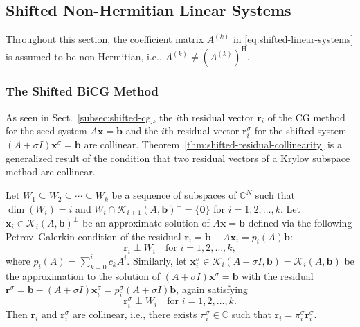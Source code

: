 \subsection{{Shifted Non-Hermitian Linear Systems}}\label{sec:shifted-nonhermitian-systems}
{Throughout this section, the coefficient matrix $A^{(k)}$ in \eqref{eq:shifted-linear-systems} is assumed to be non-Hermitian, i.e., $A^{(k)}\ne(A^{(k)})^{\mathrm H}$.}
\subsubsection{{The Shifted BiCG Method}}\label{subsec:shifted-bicg}
{As seen in Sect.\ \ref{subsec:shifted-cg}, the $i$th residual vector $\bm r_i$ of the CG method for the seed system $A\bm x=\bm b$ and the $i$th residual vector $\bm r_i^{\sigma}$ for the shifted system $(A+\sigma I)\bm x^{\sigma}=\bm b$ are collinear. Theorem\ \ref{thm:shifted-residual-collinearity} is a generalized result of the condition that two residual vectors of a Krylov subspace method are collinear.}
\par{}
\begin{Theorem}[\BookCite{67}]\label{thm:shifted-residual-collinearity}
{Let $W_1\subseteq W_2\subseteq\cdots\subseteq W_k$ be a sequence of subspaces of $\mathbb C^N$ such that $\dim(W_i)=i$ and $W_i\cap\mathcal K_{i+1}(A,\bm b)^{\perp}=\{\bm0\}$ for $i=1,2,\ldots,k$. Let $\bm x_i\in\mathcal K_i(A,\bm b)^{\perp}$ be an approximate solution of $A\bm x=\bm b$ defined via the following Petrov--Galerkin condition of the residual $\bm r_i=\bm b-A\bm x_i=p_i(A)\bm b$:}
\[\bm r_i\perp W_i\quad\text{for }i=1,2,\ldots,k,\]
{where $p_i(A)=\sum_{k=0}^i c_kA^i$. Similarly, let $\bm x_i^{\sigma}\in\mathcal K_i(A+\sigma I,\bm b)=\mathcal K_i(A,\bm b)$ be the approximation to the solution of $(A+\sigma I)\bm x^{\sigma}=\bm b$ with the residual $\bm r^{\sigma}=\bm b-(A+\sigma I)\bm x_i^{\sigma}=p_i^{\sigma}(A+\sigma I)\bm b$, again satisfying}
\[\bm r_i^{\sigma}\perp W_i\quad\text{for }i=1,2,\ldots,k.\]
{Then $\bm r_i$ and $\bm r_i^{\sigma}$ are collinear, i.e., there exists $\pi_i^{\sigma}\in\mathbb C$ such that $\bm r_i=\pi_i^{\sigma}\bm r_i^{\sigma}$.}
\end{Theorem}
